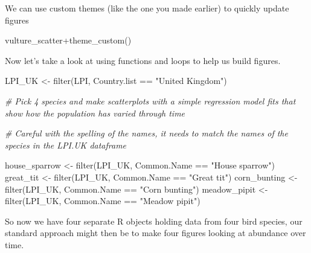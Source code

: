 \documentclass[
]{book}
\newenvironment{Shaded}{\begin{snugshade}}{\end{snugshade}}
\newcommand{\CommentTok}[1]{\textcolor[rgb]{0.56,0.35,0.01}{\textit{#1}}}
\newcommand{\FunctionTok}[1]{\textcolor[rgb]{0.00,0.00,0.00}{#1}}
\newcommand{\NormalTok}[1]{#1}
\newcommand{\OtherTok}[1]{\textcolor[rgb]{0.56,0.35,0.01}{#1}}
\newcommand{\SpecialCharTok}[1]{\textcolor[rgb]{0.00,0.00,0.00}{#1}}
\newcommand{\StringTok}[1]{\textcolor[rgb]{0.31,0.60,0.02}{#1}}
\begin{document}
We can use custom themes (like the one you made earlier) to quickly update figures

\begin{Shaded}
\begin{Highlighting}[]
\NormalTok{vulture\_scatter}\SpecialCharTok{+}\FunctionTok{theme\_custom}\NormalTok{()}
\end{Highlighting}
\end{Shaded}

Now let's take a look at using functions and loops to help us build figures.

\begin{Shaded}
\begin{Highlighting}[]
\NormalTok{LPI\_UK }\OtherTok{\textless{}{-}} \FunctionTok{filter}\NormalTok{(LPI, Country.list }\SpecialCharTok{==} \StringTok{"United Kingdom"}\NormalTok{)}

\CommentTok{\# Pick 4 species and make scatterplots with a simple regression model fits that show how the population has varied through time}

\CommentTok{\# Careful with the spelling of the names, it needs to match the names of the species in the LPI.UK dataframe}

\NormalTok{house\_sparrow }\OtherTok{\textless{}{-}} \FunctionTok{filter}\NormalTok{(LPI\_UK, Common.Name }\SpecialCharTok{==} \StringTok{"House sparrow"}\NormalTok{)}
\NormalTok{great\_tit }\OtherTok{\textless{}{-}} \FunctionTok{filter}\NormalTok{(LPI\_UK, Common.Name }\SpecialCharTok{==} \StringTok{"Great tit"}\NormalTok{)}
\NormalTok{corn\_bunting }\OtherTok{\textless{}{-}} \FunctionTok{filter}\NormalTok{(LPI\_UK, Common.Name }\SpecialCharTok{==} \StringTok{"Corn bunting"}\NormalTok{)}
\NormalTok{meadow\_pipit }\OtherTok{\textless{}{-}} \FunctionTok{filter}\NormalTok{(LPI\_UK, Common.Name }\SpecialCharTok{==} \StringTok{"Meadow pipit"}\NormalTok{)}
\end{Highlighting}
\end{Shaded}

So now we have four separate R objects holding data from four bird species, our standard approach might then be to make four figures looking at abundance over time.
\end{document}
